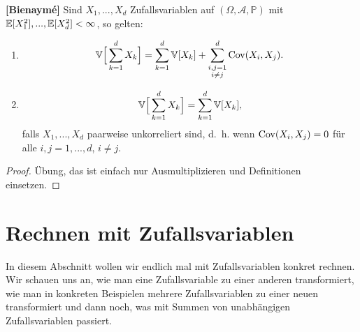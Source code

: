 \begin{satz}\label{bien}
 \textbf{[Bienaymé]}
 Sind $X_1,...,X_d$ Zufallsvariablen auf $(\Omega, \mathcal A, \mathbb P)$ mit $\mathbb{E}[X_1^2],...,\mathbb{E}[X_d^2] < \infty$, so gelten:
	\begin{enumerate}[label=(\roman*)]
		\item
		\[ \mathbb{V}\Big[\sum\limits_{k=1}^{d} X_k\Big] = \sum\limits_{k=1}^{d} \mathbb{V}[X_k] + \sum\limits_{\substack{i,j=1\\i \neq j}}^{d} \operatorname{Cov}(X_i,X_j).  \]
		\item \[ \mathbb{V}\Big[\sum\limits_{k=1}^{d} X_k\Big]= \sum\limits_{k=1}^{d} \mathbb{V}[X_k], \] falls $X_1,...,X_d$ paarweise unkorreliert sind, \mbox{d. h.} wenn $\operatorname{Cov}(X_i,X_j) = 0$ f\"ur alle $ i,j = 1,...,d$, $i\neq j$. 
	\end{enumerate}
\end{satz}

\begin{proof}
	Übung, das ist einfach nur Ausmultiplizieren und Definitionen einsetzen.
\end{proof}

\section{Rechnen mit Zufallsvariablen}\label{sec:RV}
\marginpar{\textcolor{red}{Vorlesung 22}}
In diesem Abschnitt wollen wir endlich mal mit Zufallsvariablen konkret rechnen. Wir schauen uns an, wie man eine Zufallsvariable zu einer anderen transformiert, wie man in konkreten Beispielen mehrere Zufallsvariablen zu einer neuen transformiert und dann noch, was mit Summen von unabh\"angigen Zufallsvariablen passiert.



